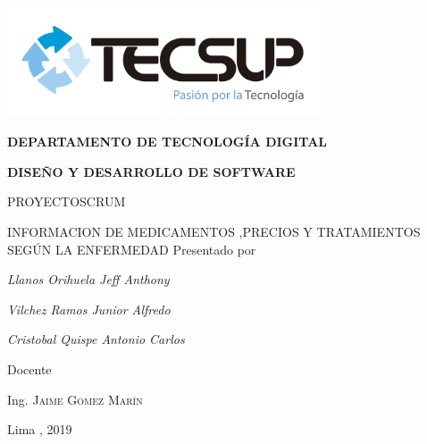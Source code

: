 \begin{titlepage}
	\centering
	\includegraphics[width=0.70\textwidth]{img/logo_tecsup_final}\par\vspace{2cm}
	\vspace{0.30cm}	
	{\scshape\large\bfseries DEPARTAMENTO DE TECNOLOG\'IA DIGITAL \par}
	\vspace{0.60cm}	
	{\scshape\large\bfseries DISEÑO Y DESARROLLO DE SOFTWARE  \par}
	\vspace{2.00cm}		
	{\large\large  PROYECTOSCRUM \par}
	\vspace{0.60cm}
	{\scshape\large INFORMACION DE MEDICAMENTOS ,PRECIOS Y TRATAMIENTOS SEGÚN LA ENFERMEDAD}
	\vspace{0.60cm}
	\vfill
	Presentado por \par
	{\large\itshape { Llanos Orihuela Jeff Anthony }\par}
	{\large\itshape { Vilchez Ramos Junior Alfredo}\par}
	{\large\itshape { Cristobal Quispe Antonio Carlos}\par}
	\vspace{0.30cm}
	\vfill
	Docente \par
	Ing.  \textsc{Jaime Gomez Marín}
	
  \vspace{0.30cm}
	\vfill
        {\large Lima , 2019 \par}
\end{titlepage}

